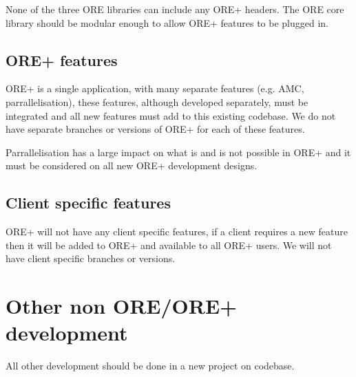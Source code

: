 \documentclass[12pt, a4paper]{article}
\begin{document}
None of the three ORE libraries can include any ORE+ headers. The ORE core library should be modular enough to allow ORE+ features to be plugged in.

\subsection*{ORE+ features}
ORE+ is a single application, with many separate features (e.g. AMC, parrallelisation), these features, although developed separately, must be integrated and all new features must add to this existing codebase. We do not have separate branches or versions of ORE+ for each of these features.

Parrallelisation has a large impact on what is and is not possible in ORE+ and it must be considered on all new ORE+ development designs.

\subsection*{Client specific features}
ORE+ will not have any client specific features, if a client requires a new feature then it will be added to ORE+ and available to all ORE+ users. We will not have client specific branches or versions.

\section*{Other non ORE/ORE+ development}
All other development should be done in a new project on codebase.
\end{document}
